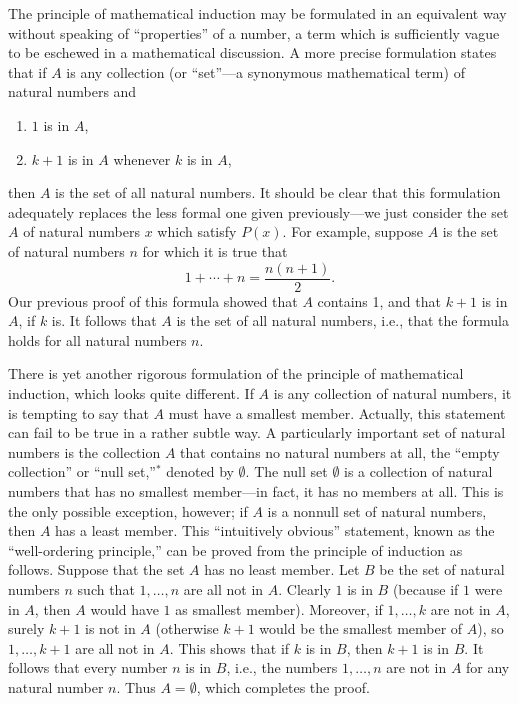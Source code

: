 The principle of mathematical induction may be formulated in an equivalent
way without speaking of ``properties'' of a number, a term which is
sufficiently vague to be eschewed in a mathematical discussion. A more precise
formulation states that if $A$ is any collection (or ``set''---a synonymous
mathematical term) of natural numbers and

\begin{enumerate}[label=(\arabic*),leftmargin=2.6em,itemsep=0pt,topsep=2pt]
\item $1$ is in $A$,
\item $k + 1$ is in $A$ whenever $k$ is in $A$,
\end{enumerate}

then $A$ is the set of all natural numbers. It should be clear that this
formulation adequately replaces the less formal one given previously---we just
consider the set $A$ of natural numbers $x$ which satisfy $P(x)$. For example,
suppose $A$ is the set of natural numbers $n$ for which it is true that
\[
1 + \cdots + n = \frac{n(n+1)}{2}.
\]
Our previous proof of this formula showed that $A$ contains 1, and that $k+1$
is in $A$, if $k$ is. It follows that $A$ is the set of all natural numbers,
i.e., that the formula holds for all natural numbers $n$.

There is yet another rigorous formulation of the principle of mathematical
induction, which looks quite different. If $A$ is any collection of natural
numbers, it is tempting to say that $A$ must have a smallest member.
Actually, this statement can fail to be true in a rather subtle way. A
particularly important set of natural numbers is the collection $A$ that
contains no natural numbers at all, the ``empty collection'' or ``null
set,''$^{*}$ denoted by $\emptyset$. The null set $\emptyset$ is a collection
of natural numbers that has no smallest member---in fact, it has no members
at all. This is the only possible exception, however; if $A$ is a nonnull set
of natural numbers, then $A$ has a least member. This ``intuitively obvious''
statement, known as the ``well-ordering principle,'' can be proved from the
principle of induction as follows. Suppose that the set $A$ has no least
member. Let $B$ be the set of natural numbers $n$ such that $1, \dots, n$ are
all not in $A$. Clearly $1$ is in $B$ (because if $1$ were in $A$, then $A$
would have $1$ as smallest member). Moreover, if $1, \dots, k$ are not in $A$,
surely $k+1$ is not in $A$ (otherwise $k+1$ would be the smallest member of
$A$), so $1, \dots, k+1$ are all not in $A$. This shows that if $k$ is in $B$,
then $k+1$ is in $B$. It follows that every number $n$ is in $B$, i.e., the
numbers $1, \dots, n$ are not in $A$ for any natural number $n$. Thus
$A = \emptyset$, which completes the proof.

